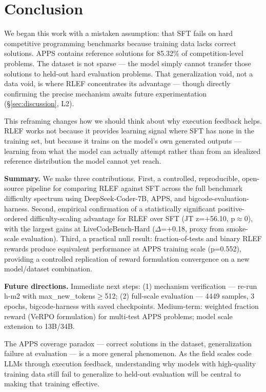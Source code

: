 \section{Conclusion}

We began this work with a mistaken assumption: that SFT fails on hard competitive programming benchmarks because training data lacks correct solutions. APPS contains reference solutions for 85.32\% of competition-level problems. The dataset is not sparse --- the model simply cannot transfer those solutions to held-out hard evaluation problems. That generalization void, not a data void, is where RLEF concentrates its advantage --- though directly confirming the precise mechanism awaits future experimentation (\S\ref{sec:discussion}, L2).

This reframing changes how we should think about why execution feedback helps. RLEF works not because it provides learning signal where SFT has none in the training set, but because it trains on the model's own generated outputs --- learning from what the model can actually attempt rather than from an idealized reference distribution the model cannot yet reach.

\textbf{Summary.} We make three contributions. First, a controlled, reproducible, open-source pipeline for comparing RLEF against SFT across the full benchmark difficulty spectrum using DeepSeek-Coder-7B, APPS, and bigcode-evaluation-harness. Second, empirical confirmation of a statistically significant positive-ordered difficulty-scaling advantage for RLEF over SFT (JT z=+56.10, p$\approx$0), with the largest gains at LiveCodeBench-Hard ($\Delta$=+0.18, proxy from smoke-scale evaluation). Third, a practical null result: fraction-of-tests and binary RLEF rewards produce equivalent performance at APPS training scale (p=0.552), providing a controlled replication of reward formulation convergence on a new model/dataset combination.

\textbf{Future directions.} Immediate next steps: (1) mechanism verification --- re-run h-m2 with max\_new\_tokens$\geq$512; (2) full-scale evaluation --- 4449 samples, 3 epochs, bigcode-harness with saved checkpoints. Medium-term: weighted fraction reward (VeRPO formulation) for multi-test APPS problems; model scale extension to 13B/34B.

The APPS coverage paradox --- correct solutions in the dataset, generalization failure at evaluation --- is a more general phenomenon. As the field scales code LLMs through execution feedback, understanding why models with high-quality training data still fail to generalize to held-out evaluation will be central to making that training effective.

